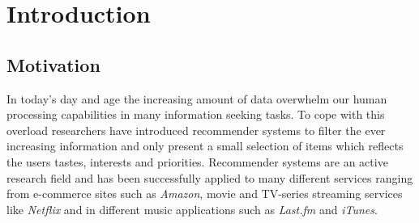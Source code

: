 
\chapter{Introduction}
\label{chap:introduction}
\minitoc
\setcounter{page}{1}
\clearpage

\newcommand{\ecommercenorway}[0]{
  \begin{figure}[H]
    \centering
    \begin{tikzpicture}
      \begin{axis}[
        xlabel={Year},
        ylabel={Percentage},
        legend style={cells={anchor=east}, legend pos=outer north east,},
        xtick=data,
        x tick label style={rotate=45, anchor=east, /pgf/number format/1000 sep=},
        mark size=1.0pt,
        grid=major,
        grid style={dashed},
      ]
      \legend{Both sexes, Men, Women}
      \addplot coordinates {
        (2005, 0)
        (2006, 20)
        (2007, 20)
        (2008, 22)
        (2009, 25)
        (2010, 32)
        (2011, 31)
        (2012, 33)
        (2013, 36)
      };
      \addplot coordinates {
        (2005, 0)
        (2006, 16)
        (2007, 18)
        (2008, 20)
        (2009, 23)
        (2010, 30)
        (2011, 30)
        (2012, 29)
        (2013, 30)
      };
      \addplot coordinates {
        (2005, 0)
        (2006, 24)
        (2007, 23)
        (2008, 23)
        (2009, 27)
        (2010, 34)
        (2011, 31)
        (2012, 37)
        (2013, 42)
      };
      \end{axis}
    \end{tikzpicture}
    \caption{E-commerce purchases in Norway since 2005~\cite{statisticsNorway}}
    \label{fig:ecommerce-norway}
  \end{figure}
}

\section{Motivation}
\label{sec:motivation}

In today's day and age the increasing amount of data overwhelm our human
processing capabilities in many information seeking tasks. To cope with this
overload researchers have introduced recommender systems to filter the ever
increasing information and only present a small selection of items which
reflects the users tastes, interests and priorities. Recommender systems are an
active research field and has been successfully applied to many different
services ranging from e-commerce sites such as \emph{Amazon}, movie and
TV-series streaming services like \emph{Netflix} and in different music
applications such as \emph{Last.fm} and \emph{iTunes}.

